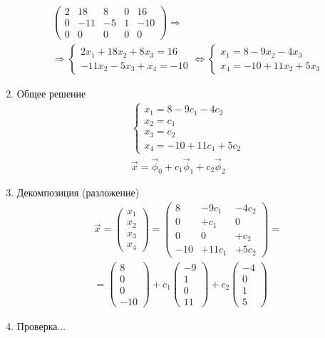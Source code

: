 \documentclass{article}
\begin{document}
\begin{enumerate}
\begin{gather*}
		\begin{pmatrix}
			2 & 18 & 8 & 0 & 16 \\
			0 & -11 & -5 & 1 & -10 \\
			0 & 0 & 0 & 0 & 0
		\end{pmatrix} \Rightarrow \\
		\Rightarrow \begin{cases}
			2x_1 + 18x_2 + 8x_3 = 16 \\
			-11x_2 -5x_3 + x_4 = -10
		\end{cases} \Leftrightarrow \begin{cases}
			x_1 = 8 - 9x_2 - 4x_3 \\
			x_4 = -10 + 11x_2 + 5x_3
		\end{cases}
	\end{gather*}
	\item Общее решение
	\begin{gather*}
		\begin{cases}
			x_1 = 8 - 9c_1 - 4c_2 \\
			x_2 = c_1 \\
			x_3 = c_2 \\
			x_4 = -10 + 11c_1 + 5c_2
		\end{cases} \\
		\vec{x} = \vec{\phi}_0 + c_1 \vec{\phi}_1 + c_2 \vec{\phi}_2
	\end{gather*}
	\item Декомпозиция (разложение)
	\begin{gather*}
		\vec{x} = \begin{pmatrix}
			x_1 \\ x_2 \\ x_3 \\ x_4
		\end{pmatrix} =
		\begin{pmatrix}
			8 & -9c_1 & -4c_2 \\
			0 & +c_1 & 0 \\
			0 & 0 & +c_2 \\
			-10 & +11c_1 & +5c_2
		\end{pmatrix} = \\
		= \begin{pmatrix}
			8 \\ 0 \\ 0 \\ -10
		\end{pmatrix} +
		c_1 \begin{pmatrix}
			-9 \\ 1 \\ 0 \\ 11
		\end{pmatrix} +
		c_2 \begin{pmatrix}
			-4 \\ 0 \\ 1 \\ 5
		\end{pmatrix}
	\end{gather*}
	\item Проверка...
\end{enumerate}
\end{document}
